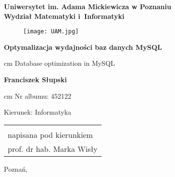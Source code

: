 \begin{titlepage}%
	
	\let\footnotesize\small
	\let\footnoterule\relax
	\let \footnote \thanks
	
	\begin{center}%
		{\Large \bf Uniwersytet im. Adama Mickiewicza w Poznaniu \\ Wydział Matematyki i~Informatyki\par}
	\end{center}%
	\vspace{-0.5 cm}
	\noindent\hrulefill
	
	\vspace{0.75cm plus 1mm minus 2mm}
	
	\setlength{\oddsidemargin}{0.2in}
	\begin{figure}[h]
		\label{UAM}
		\begin{center}
			\leavevmode
			\texttt{[image: UAM.jpg]}
		\end{center}
	\end{figure}
	\setlength{\oddsidemargin}{0.5in}
	
	\vspace{1 cm plus 1mm minus 2mm}
	
	\begin{center}%
		{\Large\textbf{Optymalizacja wydajności baz danych MySQL}\par
			 cm
			{\large Database optimization in MySQL} }
		
		\vspace{1.0cm plus 1fill}
		\begin{flushleft}%
			{\center 
				\Large\textbf{Franciszek Słupski}\par
				 cm
				\small 
				Nr albumu: 452122\par
				Kierunek: Informatyka\par
			}
			
		\end{flushleft}%
		
		\vspace{2.5cm plus 1.5fill}
		
		\begin{flushright}\large
			\begin{tabular}{l}
				{\small Praca magisterska \\
					\small napisana pod kierunkiem \\
					\small prof. dr hab. Marka Wisły 
				}
			\end{tabular}
		\end{flushright}
		
		\vspace{2cm plus .1fill}
		{Poznań,\par}
	\end{center}
\end{titlepage}%
